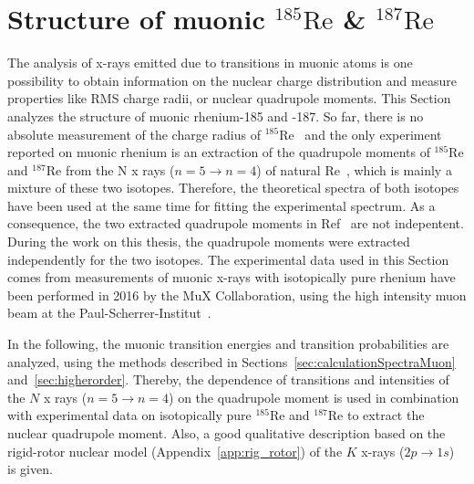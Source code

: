 \section{Structure of muonic $^{185}\text{Re}$ \& $^{187}\text{Re}$}
\label{sec:muon_re}
The analysis of x-rays emitted due to transitions in muonic atoms is one possibility to obtain information on the nuclear charge distribution and measure properties like RMS charge radii, or nuclear quadrupole moments. This Section analyzes the structure of muonic rhenium-185 and -187. So far, there is no absolute measurement of the charge radius of $^{185}$Re~\cite{schopper2004} and the only experiment reported on muonic rhenium is an extraction of the quadrupole moments of $^{185}$Re and $^{187}$Re from the N x rays (${n}{=}{5}\rightarrow{n}{=}{4}$) of natural Re~\cite{konijn1979}, which is mainly a mixture of these two isotopes. Therefore, the theoretical spectra of both isotopes have been used at the same time for fitting the experimental spectrum. As a consequence, the two extracted quadrupole moments in Ref~\cite{konijn1979} are not indepentent. During the work on this thesis, the quadrupole moments were extracted independently for the two isotopes. 
The experimental data used in this Section comes from measurements of muonic x-rays with isotopically pure rhenium have been performed in 2016 by the MuX Collaboration, using the high intensity muon beam at the Paul-Scherrer-Institut~\cite{psiExperiments,psiFacilities}.

In the following, the muonic transition energies and transition probabilities are analyzed, using the methods described in Sections~\ref{sec:calculationSpectraMuon} and~\ref{sec:higherorder}. Thereby, the dependence of transitions and intensities of the $N$ x rays ($n=5\rightarrow n=4$) on the quadrupole moment is used in combination with experimental data on isotopically pure $^{185}$Re and $^{187}$Re to extract the nuclear quadrupole moment. Also, a good qualitative description based on the rigid-rotor nuclear model (Appendix~\ref{app:rig_rotor}) of the $K$ x-rays ($2p\rightarrow 1s$) is given.


